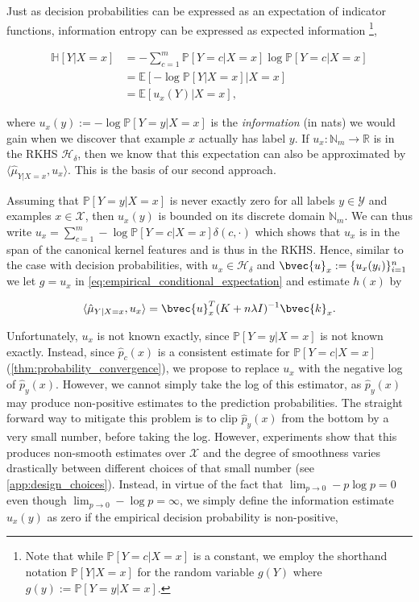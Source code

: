 \documentclass{article}
\begin{document}
	Just as decision probabilities can be expressed as an expectation of indicator functions, information entropy can be expressed as expected information \footnote{Note that while $\mathbb{P}[Y = c | X = x]$ is a constant, we employ the shorthand notation $\mathbb{P}[Y| X = x]$ for the random variable $g(Y)$ where $g(y) := \mathbb{P}[Y = y | X = x]$.},
	
	\begin{equation}
	\begin{aligned}
		\mathbb{H}[Y | X = x] &= - \sum_{c = 1}^{m} \mathbb{P}[Y = c| X = x] \log{\mathbb{P}[Y = c | X = x]} \\
		&= \mathbb{E}[- \log{\mathbb{P}[Y | X = x]} | X = x] \\
		&= \mathbb{E}[u_{x}(Y) | X = x],
	\end{aligned}
	\end{equation}
	
	where $u_{x}(y) := - \log{\mathbb{P}[Y = y | X = x]}$ is the \textit{information} (in nats) we would gain when we discover that example $x$ actually has label $y$. If $u_{x} : \mathbb{N}_{m} \to \mathbb{R}$ is in the RKHS $\mathcal{H}_{\delta}$, then we know that this expectation can also be approximated by $\langle \hat{\mu}_{Y | X = x}, u_{x} \rangle$. This is the basis of our second approach.
	
	Assuming that $\mathbb{P}[Y = y | X = x]$ is never exactly zero for all labels $y \in \mathcal{Y}$ and examples $x \in \mathcal{X}$, then $u_{x}(y)$ is bounded on its discrete domain $\mathbb{N}_{m}$. We can thus write $u_{x} = \sum_{c = 1}^{m} - \log{\mathbb{P}[Y = c | X = x]} \delta(c, \cdot)$ which shows that $u_{x}$ is in the span of the canonical kernel features and is thus in the RKHS. Hence, similar to the case with decision probabilities, with $u_{x} \in \mathcal{H}_{\delta}$ and $\bvec{u}_{x} := \{u_{x}(y_{i})\}_{i = 1}^{n}$ we let $g = u_{x}$ in \eqref{eq:empirical_conditional_expectation} and estimate $h(x)$ by
	
	\begin{equation}
		\langle \hat{\mu}_{Y | X = x}, u_{x} \rangle = \bvec{u}_{x}^{T} (K + n \lambda I)^{-1} \bvec{k}_{x}.
	\end{equation}
	
	Unfortunately, $u_{x}$ is not known exactly, since $\mathbb{P}[Y = y | X = x]$ is not known exactly. Instead, since $\hat{p}_{c}(x)$ is a consistent estimate for $\mathbb{P}[Y = c | X = x]$ (\cref{thm:probability_convergence}), we propose to replace $u_{x}$ with the negative log of $\hat{p}_{y}(x)$. However, we cannot simply take the log of this estimator, as $\hat{p}_{y}(x)$ may produce non-positive estimates to the prediction probabilities. The straight forward way to mitigate this problem is to clip $\hat{p}_{y}(x)$ from the bottom by a very small number, before taking the log. However, experiments show that this produces non-smooth estimates over $\mathcal{X}$ and the degree of smoothness varies drastically between different choices of that small number (see \cref{app:design_choices}). Instead, in virtue of the fact that $\lim_{p \to 0} - p \log{p} = 0$ even though $\lim_{p \to 0} - \log{p} = \infty$, we simply define the information estimate $\hat{u}_{x}(y)$ as zero if the empirical decision probability is non-positive,
	
\end{document}
